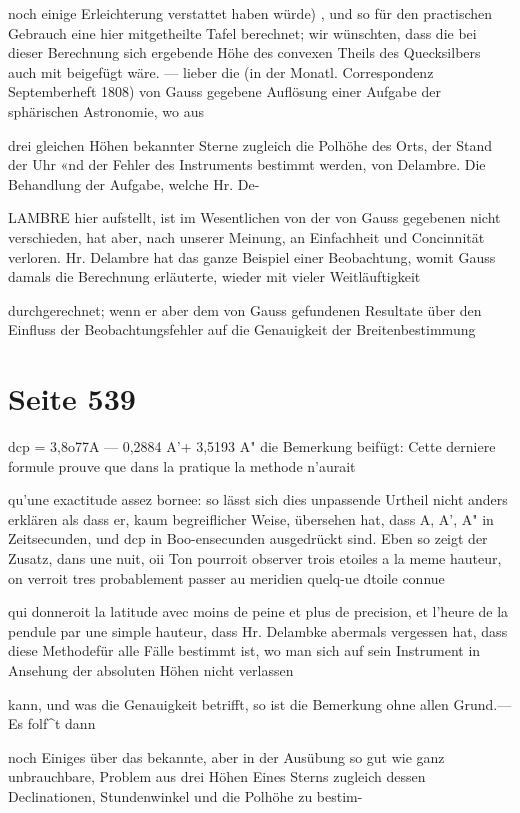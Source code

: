 \documentclass[10pt,a4paper]{article}
\begin{document}
noch einige Erleichterung verstattet haben würde) , und so für den practischen Gebrauch eine hier mitgetheilte Tafel berechnet; wir wünschten, dass die bei dieser Berechnung sich ergebende Höhe des convexen Theils des Quecksilbers auch mit beigefügt wäre. — lieber die (in der Monatl. Correspondenz Septemberheft 1808) von Gauss gegebene Auflösung einer Aufgabe der sphärischen Astronomie, wo aus

drei gleichen Höhen bekannter Sterne zugleich die Polhöhe des Orts, der Stand der Uhr «nd der Fehler des Instruments bestimmt werden, von Delambre. Die Behandlung der Aufgabe, welche Hr. De-

LAMBRE hier aufstellt, ist im Wesentlichen von der von Gauss gegebenen nicht verschieden, hat aber, nach unserer Meinung, an Einfachheit und Concinnität verloren. Hr. Delambre hat das ganze Beispiel einer Beobachtung, womit Gauss damals die Berechnung erläuterte, wieder mit vieler Weitläuftigkeit

durchgerechnet; wenn er aber dem von Gauss gefundenen Resultate über den Einfluss der Beobachtungsfehler auf die Genauigkeit der Breitenbestimmung


\newpage
\section*{Seite 539}
dcp = 3,8o77A — 0,2884 A'+ 3,5193 A" die Bemerkung beifügt: Cette derniere formule prouve que dans la pratique la methode n'aurait

qu'une exactitude assez bornee: so lässt sich dies unpassende Urtheil nicht anders erklären als dass er, kaum begreiflicher Weise, übersehen hat, dass A, A', A" in Zeitsecunden, und dcp in Boo-ensecunden ausgedrückt sind. Eben so zeigt der Zusatz, dans une nuit, oii Ton pourroit observer trois etoiles a la meme hauteur, on verroit tres probablement passer au meridien quelq-ue dtoile connue

qui donneroit la latitude avec moins de peine et plus de precision, et l'heure de la pendule par une simple hauteur, dass Hr. Delambke abermals vergessen hat, dass diese Methodefür alle Fälle bestimmt ist, wo man sich auf sein Instrument in Ansehung der absoluten Höhen nicht verlassen

kann, und was die Genauigkeit betrifft, so ist die Bemerkung ohne allen Grund.— Es folf\textasciicircum{}t dann

noch Einiges über das bekannte, aber in der Ausübung so gut wie ganz unbrauchbare, Problem aus drei Höhen Eines Sterns zugleich dessen Declinationen, Stundenwinkel und die Polhöhe zu bestim-
\end{document}
